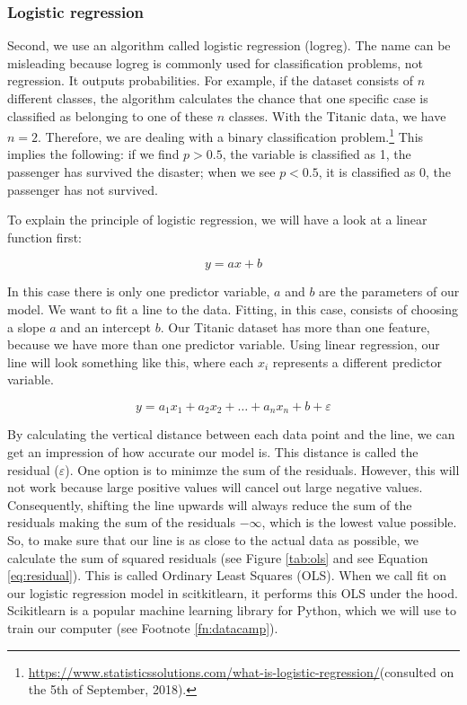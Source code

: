 \documentclass[11pt]{article}
\begin{document}
\subsubsection{Logistic regression}
\label{sec:org9ad65f4}
Second, we use an algorithm called logistic regression (logreg). The name can be misleading because logreg is commonly used for classification problems, not regression. It outputs probabilities. For example, if the dataset consists of \(n\) different classes, the algorithm calculates the chance that one specific case is classified as belonging to one of these \(n\) classes. With the Titanic data, we have \(n=2\). Therefore, we are dealing with a binary classification problem.\footnote{\url{https://www.statisticssolutions.com/what-is-logistic-regression/}(consulted on the 5th of September, 2018).} This implies the following: if we find \(p>0.5\), the variable is classified as 1, the passenger has survived the disaster; when we see \(p<0.5\), it is classified as 0, the passenger has not survived. 

To explain the principle of logistic regression, we will have a look at a linear function first:

\begin{equation}
y=ax+b
\end{equation} 

In this case there is only one predictor variable, \(a\) and \(b\) are the parameters of our model. We want to fit a line to the data. Fitting, in this case, consists of choosing a slope \(a\) and an intercept \(b\). Our Titanic dataset has more than one feature, because we have more than one predictor variable. Using linear regression, our line will look something like this, where each \(x_i\) represents a different predictor variable. 

\begin{equation}
y=a_1x_1+a_2x_2+ \dots + a_nx_n+b+\varepsilon  
\end{equation}

By calculating the vertical distance between each data point and the line, we can get an impression of how accurate our model is. This distance is called the residual (\(\varepsilon\)). One option is to minimze the sum of the residuals. However, this will not work because large positive values will cancel out large negative values. Consequently, shifting the line upwards will always reduce the sum of the residuals making the sum of the residuals \(-\infty\), which is the lowest value possible. So, to make sure that our line is as close to the actual data as possible, we calculate the sum of squared residuals (see Figure \ref{tab:ols} and see Equation \ref{eq:residual}). This is called Ordinary Least Squares (OLS). When we call fit on our logistic regression model in scitkitlearn, it performs this OLS under the hood. Scikitlearn is a popular machine learning library for Python, which we will use to train our computer (see Footnote \ref{fn:datacamp}).
\end{document}
